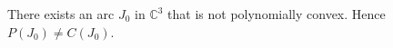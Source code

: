 
There exists an arc $J_0$ in $\mathbb{C}^3$ that is not polynomially convex. Hence $P(J_0) \neq C(J_0)$.
